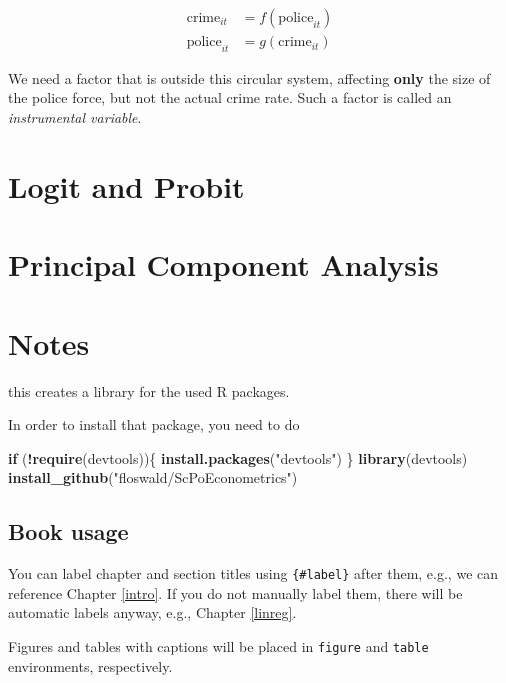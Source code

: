 \documentclass[]{book}
\newenvironment{Shaded}{\begin{snugshade}}{\end{snugshade}}
\newcommand{\KeywordTok}[1]{\textcolor[rgb]{0.13,0.29,0.53}{\textbf{#1}}}
\newcommand{\StringTok}[1]{\textcolor[rgb]{0.31,0.60,0.02}{#1}}
\newcommand{\ControlFlowTok}[1]{\textcolor[rgb]{0.13,0.29,0.53}{\textbf{#1}}}
\newcommand{\OperatorTok}[1]{\textcolor[rgb]{0.81,0.36,0.00}{\textbf{#1}}}
\newcommand{\NormalTok}[1]{#1}
\theoremstyle{definition}
\theoremstyle{definition}
\theoremstyle{definition}
\theoremstyle{remark}
\begin{document}
\begin{align*}
\text{crime}_{it} &= f(\text{police}_{it}) \\
\text{police}_{it}&= g(\text{crime}_{it} )
\end{align*}

We need a factor that is outside this circular system, affecting
\textbf{only} the size of the police force, but not the actual crime
rate. Such a factor is called an \emph{instrumental variable}.

\chapter{Logit and Probit}\label{logit-probit}

\chapter{Principal Component Analysis}\label{pca}

\chapter{Notes}\label{notes}

this creates a library for the used R packages.

In order to install that package, you need to do

\begin{Shaded}
\begin{Highlighting}[]
\ControlFlowTok{if}\NormalTok{ (}\OperatorTok{!}\KeywordTok{require}\NormalTok{(devtools))\{}
  \KeywordTok{install.packages}\NormalTok{(}\StringTok{"devtools"}\NormalTok{)}
\NormalTok{\}}
\KeywordTok{library}\NormalTok{(devtools)}
\KeywordTok{install_github}\NormalTok{(}\StringTok{"floswald/ScPoEconometrics"}\NormalTok{)  }
\end{Highlighting}
\end{Shaded}

\section{Book usage}\label{book-usage}

You can label chapter and section titles using \texttt{\{\#label\}}
after them, e.g., we can reference Chapter \ref{intro}. If you do not
manually label them, there will be automatic labels anyway, e.g.,
Chapter \ref{linreg}.

Figures and tables with captions will be placed in \texttt{figure} and
\texttt{table} environments, respectively.
\end{document}
